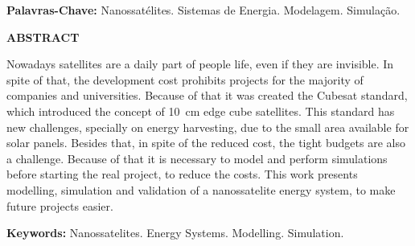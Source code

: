 \documentclass[a5paper, oldfontcommands, hidelinks]{ufsc-thesis}  %
\begin{document}
\noindent\textbf{Palavras-Chave:} Nanossatélites. Sistemas de Energia. Modelagem. Simulação.

\clearpage
\begin{center}
\large\textbf{ABSTRACT}
\end{center}
Nowadays satellites are a daily part of people life, even if they are invisible. In spite of that, the development cost prohibits projects for the majority of companies and universities. Because of that it was created the Cubesat standard, which introduced the concept of \SI{10}{\centi\metre} edge cube satellites. This standard has new challenges, specially on energy harvesting, due to the small area available for solar panels. Besides that, in spite of the reduced cost, the tight budgets are also a challenge.  Because of that it is necessary to model and perform simulations before starting the real project, to reduce the costs. This work  presents modelling, simulation and validation of a nanossatelite energy system, to make future projects easier.

\noindent\textbf{Keywords:} Nanossatelites. Energy Systems. Modelling. Simulation.

\clearpage
\listoffigures
\clearpage
\listoftables
\glsaddall 
\printglossary[type=\acronymtype, title = Lista de Abreviaturas e Siglas]
\clearpage
\setcounter{tocdepth}{3} %
\tableofcontents















\printbibliography
\end{document}
